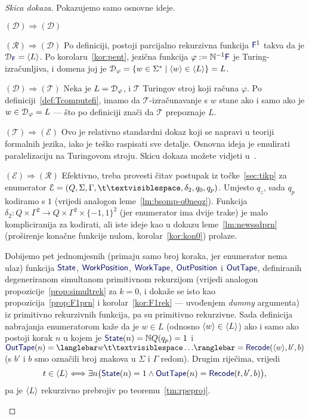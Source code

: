 \begin{proof}[Skica dokaza] Pokazujemo samo osnovne ideje.
\begin{labeling}{$(\mathcal D)\Rightarrow(\mathcal D)$}
\item[$(\mathcal R)\Rightarrow(\mathcal D)$]
Po definiciji, postoji parcijalno rekurzivna funkcija $\f F^1$ takva da je $\dom{\f F}=\kr L$. Po korolaru~\ref{kor:pent}, jezična funkcija $\varphi:=\N^{-1}\f F$ je Turing-izračunljiva, i domena joj je $\mathcal D_{\varphi}=\{w\in\Sigma^*\mid\langle w\rangle\in\langle L\rangle\}=L$.

\item[$(\mathcal D)\Rightarrow(\mathcal T)$] 
Neka je $L=\mathcal D_{\varphi}$, i $\mathcal T$ Turingov stroj koji računa $\varphi$. Po definiciji~\ref{def:Tcomputefi}, imamo da $\mathcal T$-izračunavanje s $w$ stane ako i samo ako je $w\in\mathcal D_{\varphi}=L$ --- što po definiciji znači da $\mathcal T$ prepoznaje $L$.

\item[$(\mathcal T)\Rightarrow(\mathcal E)$] 
Ovo je relativno standardni dokaz koji se napravi u teoriji formalnih jezika, iako je teško raspisati sve detalje. Osnovna ideja je emulirati paralelizaciju na Turingovom stroju. Skicu dokaza možete vidjeti u~\cite[\emph{theorem}~3.21]{sipser}.

\item[$(\mathcal E)\Rightarrow(\mathcal R)$] 
Efektivno, treba provesti čitav postupak iz točke~\ref{sec:tikp} za enumerator $\mathcal E=(Q,\Sigma,\Gamma,\bl,\delta_2,q_0,q_p)$. Umjesto $q_z$, sada $q_p$ kodiramo s $1$ (vrijedi analogon leme~\ref{lm:bsomp-q0neqz}). Funkcija $\delta_2:Q\times\Gamma^2\to Q\times\Gamma^2\times\{-1,1\}^2$ (jer enumerator ima dvije trake) je malo kompliciranija za kodirati, ali iste ideje kao u dokazu leme~\ref{lm:newssdprn} (proširenje konačne funkcije nulom, korolar~\ref{kor:kon0}) prolaze.

Dobijemo pet jednomjesnih (primaju samo broj koraka, jer enumerator nema ulaz) funkcija $\f{State}$, $\f{WorkPosition}$, $\f{WorkTape}$, $\f{OutPosition}$ i $\f{OutTape}$, definiranih degeneriranom simultanom primitivnom rekurzijom (vrijedi analogon propozicije~\ref{prop:simultrek} za $k=0$, i dokaže se isto kao propozicija~\ref{prop:F1prn} i korolar~\ref{kor:F1rek} --- uvođenjem \emph{dummy} argumenta) iz primitivno rekurzivnih funkcija, pa su primitivno rekurzivne. Sada definicija nabrajanja enumeratorom kaže da je $w\in L$ (odnosno $\langle w\rangle\in\langle L\rangle$) ako i samo ako postoji korak $n$ u kojem je $\f{State}(n)=\N Q(q_p)=1$ i $\f{OutTape}(n)=\knk{w\bl\ldots}=\f{Recode}(\kr w,b',b)$ (s $b'$ i $b$ smo označili broj znakova u $\Sigma$ i $\Gamma$ redom). Drugim riječima, vrijedi
\begin{equation}
    t\in\kr L\Longleftrightarrow\exists n\bigl(\f{State}(n)=1\land\f{OutTape}(n)=\f{Recode}(t,b',b)\bigr)\text,
\end{equation}
pa je $\langle L\rangle$ rekurzivno prebrojiv po teoremu~\ref{tm:rpeproj}.\qedhere
\end{labeling}
\end{proof}
